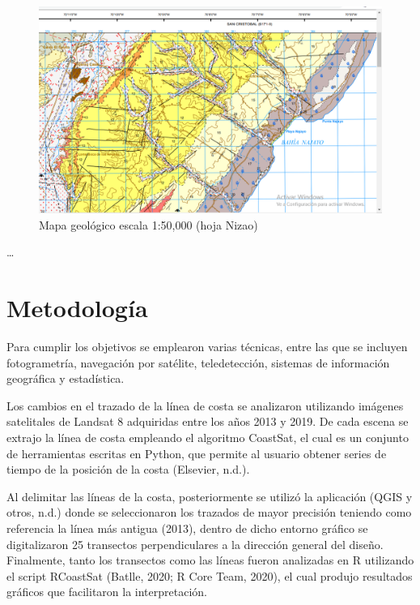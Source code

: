 \documentclass[11pt,]{article}
\begin{document}
\begin{figure}
\centering
\includegraphics{mapa_bahia_najayo.png}
\caption{Mapa geológico escala 1:50,000 (hoja Nizao)\label{mapageo50k}}
\end{figure}

\ldots

\section{Metodología}\label{metodologuxeda}

Para cumplir los objetivos se emplearon varias técnicas, entre las que
se incluyen fotogrametría, navegación por satélite, teledetección,
sistemas de información geográfica y estadística.

Los cambios en el trazado de la línea de costa se analizaron utilizando
imágenes satelitales de Landsat 8 adquiridas entre los años 2013 y 2019.
De cada escena se extrajo la línea de costa empleando el algoritmo
CoastSat, el cual es un conjunto de herramientas escritas en Python, que
permite al usuario obtener series de tiempo de la posición de la costa
(Elsevier, n.d.).

Al delimitar las líneas de la costa, posteriormente se utilizó la
aplicación (QGIS y otros, n.d.) donde se seleccionaron los trazados de
mayor precisión teniendo como referencia la línea más antigua (2013),
dentro de dicho entorno gráfico se digitalizaron 25 transectos
perpendiculares a la dirección general del diseño. Finalmente, tanto los
transectos como las líneas fueron analizadas en R utilizando el script
RCoastSat (Batlle, 2020; R Core Team, 2020), el cual produjo resultados
gráficos que facilitaron la interpretación.
\end{document}
